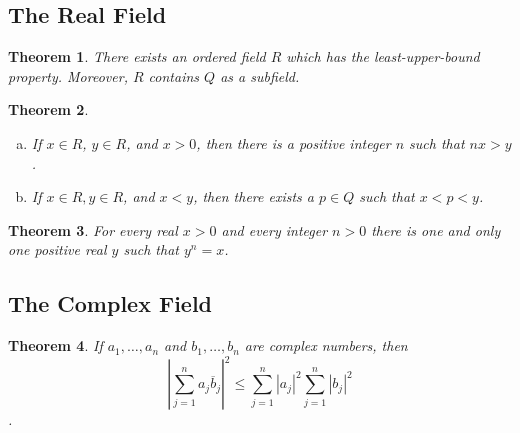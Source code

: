 \documentclass{article}
\newtheorem{theorem}{Theorem}
\numberwithin{theorem}{section}
\numberwithin{definition}{section}
\begin{document}
\subsection*{The Real Field}

\setcounter{theorem}{18}
\begin{theorem}
  There exists an ordered field $R$ which has the least-upper-bound property.
  Moreover, $R$ contains $Q$ as a subfield.
\end{theorem}

\begin{theorem}
  \begin{enumerate}[(a)]
    \item If $x \in R$, $y \in R$, and $x > 0$, then there is a positive integer
      $n$ such that $nx > y$.
    \item If $x \in R, y \in R$, and $x < y$, then there exists a $p \in Q$ such
      that $x < p < y$.
  \end{enumerate}
\end{theorem}

\begin{theorem}
  For every real $x > 0$ and every integer $n > 0$ there is one and only one
  positive real $y$ such that $y^n = x$.
\end{theorem}

\subsection*{The Complex Field}

\setcounter{theorem}{34}
\begin{theorem}
  If $a_1, \ldots, a_n$ and $b_1, \ldots, b_n$ are complex numbers, then \[
    \left|\sum_{j=1}^n a_j\overline{b}_j\right|^2 \leq
    \sum_{j=1}^n |a_j|^2 \sum_{j=1}^n |b_j|^2
  \].
\end{theorem}
\end{document}
